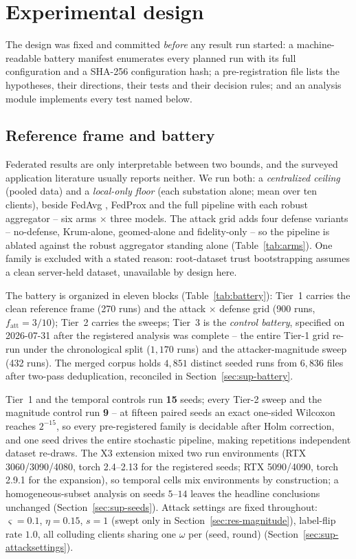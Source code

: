 \section{Experimental design}
\label{sec:design}

The design was fixed and committed \emph{before} any result run started:
a machine-readable battery manifest enumerates every planned run with its
full configuration and a SHA-256 configuration hash; a pre-registration
file lists the hypotheses, their directions, their tests and their
decision rules; and an analysis module implements every test named
below.

\subsection{Reference frame and battery}
\label{sec:design-arms}

Federated results are only interpretable between two bounds, and the
surveyed application literature usually reports neither. We run both: a
\emph{centralized ceiling} (pooled data) and a \emph{local-only floor}
(each substation alone; mean over ten clients), beside FedAvg
\cite{mcmahan2017}, FedProx \cite{li2020fedprox} and the full pipeline
with each robust aggregator -- six arms $\times$ three models. The
attack grid adds four defense variants -- no-defense, Krum-alone,
geomed-alone and fidelity-only -- so the pipeline is ablated against the
robust aggregator standing alone (Table~\ref{tab:arms}). One family is
excluded with a stated reason: root-dataset trust bootstrapping
\cite{cao2021fltrust} assumes a clean server-held dataset, unavailable
by design here.

The battery is organized in eleven blocks (Table~\ref{tab:battery}):
Tier~1 carries the clean reference frame (270 runs) and the attack
$\times$ defense grid (900 runs, $f_{\mathrm{att}}=3/10$); Tier~2
carries the sweeps; Tier~3 is the \emph{control battery}, specified on
2026-07-31 after the registered analysis was complete -- the entire
Tier-1 grid re-run under the chronological split ($1{,}170$ runs) and
the attacker-magnitude sweep (432 runs). The merged corpus holds
$4{,}851$ distinct seeded runs from $6{,}836$ files after two-pass
deduplication, reconciled in Section~\ref{sec:sup-battery}.

Tier~1 and the temporal controls run \textbf{15} seeds; every Tier-2
sweep and the magnitude control run \textbf{9} -- at fifteen paired
seeds an exact one-sided Wilcoxon reaches $2^{-15}$, so every
pre-registered family is decidable after Holm correction, and one seed
drives the entire stochastic pipeline, making repetitions independent
dataset re-draws. The X3 extension mixed two run environments (RTX
3060/3090/4080, torch 2.4--2.13 for the registered seeds; RTX 5090/4090,
torch 2.9.1 for the expansion), so temporal cells mix environments by
construction; a homogeneous-subset analysis on seeds $5$--$14$ leaves
the headline conclusions unchanged (Section~\ref{sec:sup-seeds}).
Attack settings are fixed throughout: $\varsigma=0.1$, $\eta=0.15$,
$s=1$ (swept only in Section~\ref{sec:res-magnitude}), label-flip rate
$1.0$, all colluding clients sharing one $\omega$ per (seed, round)
(Section~\ref{sec:sup-attacksettings}).

